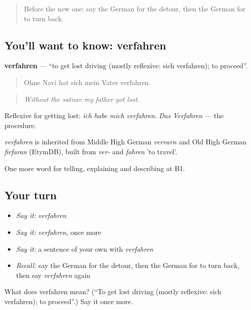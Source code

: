 \label{lesson:GE-C435-verfahren}



\begin{quote}
Before the new one: say the German for the detour, then the German for to turn back.
\end{quote}

\subsection*{You'll want to know: verfahren}
\textbf{verfahren} — \textquotedblleft{}to get lost driving (mostly reflexive: sich verfahren); to proceed\textquotedblright{}.

\begin{quote}
Ohne Navi hat sich mein Vater verfahren.
\end{quote}

\begin{quote}
\emph{Without the satnav my father got lost.}
\end{quote}

Reflexive for getting lost: \emph{ich habe mich verfahren}. \emph{Das Verfahren} — the procedure.

\begin{cousinweb}
\emph{verfahren} is inherited from Middle High German \emph{vervarn} and Old High German \emph{firfaran} (EtymDB), built from \emph{ver-} and \emph{fahren} 'to travel'.
\end{cousinweb}

\begin{grammarlens}[title={What you've built}]
One more word for telling, explaining and describing at B1.
\end{grammarlens}

\subsection*{Your turn}
\begin{itemize}
\raggedright
  \item \emph{Say it:} \emph{verfahren}
  \item \emph{Say it:} \emph{verfahren}, once more
  \item \emph{Say it:} a sentence of your own with \emph{verfahren}
  \item \emph{Recall:} say the German for the detour, then the German for to turn back, then say \emph{verfahren} again
\end{itemize}

\begin{tcolorbox}[breakable,colback=teal!4,colframe=teal!35!black,title={Before you move on}]
What does verfahren mean? (\textquotedblleft{}To get lost driving (mostly reflexive: sich verfahren); to proceed\textquotedblright{}.) Say it once more.
\end{tcolorbox}
